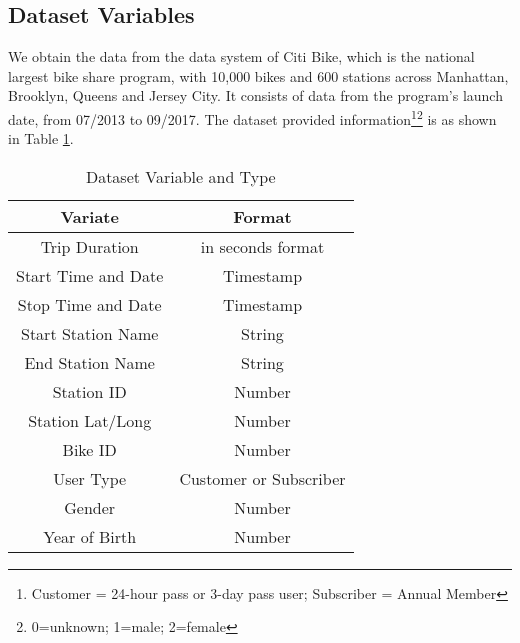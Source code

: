 \subsection{Dataset Variables}
  \par We obtain the data from the data system of Citi Bike, which is the national largest bike share program, with 10,000 bikes and 600 stations across Manhattan, Brooklyn, Queens and Jersey City\cite{bike}. It consists of data from the program's launch date, from 07/2013 to 09/2017. The dataset provided information\footnote{Customer = 24-hour pass or 3-day pass user; Subscriber = Annual Member}\footnote{0=unknown; 1=male; 2=female} is as shown in Table \ref{tab_1}. 
	\begin{center}
	\begin{table}[h!]
	\caption{Dataset Variable and Type}
	\label{tab_1}
	\begin{tabular}{ |c|c| } 
	 \hline
	 Variate & Format \\ 
	 \hline
	 Trip Duration & in seconds format \\ 
	 \hline
	 Start Time and Date & Timestamp\\ 
	 \hline
	 Stop Time and Date & Timestamp\\
	 \hline
	 Start Station Name & String\\
	 \hline
	 End Station Name & String\\
	 \hline
	 Station ID & Number\\
	 \hline
	 Station Lat/Long & Number\\
	 \hline
	 Bike ID & Number\\
	 \hline
	 User Type & Customer or Subscriber  \\
	 \hline
	 Gender & Number  \\
	 \hline
	 Year of Birth & Number\\
	 \hline
	\end{tabular}
	\end{table}
	\end{center}	
